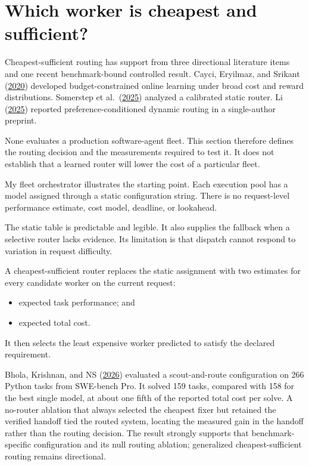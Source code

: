 \hypertarget{which-worker-is-cheapest-and-sufficient}{%
\section{Which worker is cheapest and sufficient?}\label{which-worker-is-cheapest-and-sufficient}}

Cheapest-sufficient routing has support from three directional literature items and one recent benchmark-bound controlled result. Cayci, Eryilmaz, and Srikant (\href{https://arxiv.org/abs/2003.00365}{2020}) developed budget-constrained online learning under broad cost and reward distributions. Somerstep et al.~(\href{https://arxiv.org/abs/2502.03261}{2025}) analyzed a calibrated static router. Li (\href{https://arxiv.org/abs/2502.02743}{2025}) reported preference-conditioned dynamic routing in a single-author preprint.

None evaluates a production software-agent fleet. This section therefore defines the routing decision and the measurements required to test it. It does not establish that a learned router will lower the cost of a particular fleet.

My fleet orchestrator illustrates the starting point. Each execution pool has a model assigned through a static configuration string. There is no request-level performance estimate, cost model, deadline, or lookahead.

The static table is predictable and legible. It also supplies the fallback when a selective router lacks evidence. Its limitation is that dispatch cannot respond to variation in request difficulty.


A cheapest-sufficient router replaces the static assignment with two estimates for every candidate worker on the current request:

\begin{itemize}
\tightlist
\item
  expected task performance; and
\item
  expected total cost.
\end{itemize}

It then selects the least expensive worker predicted to satisfy the declared requirement.

Bhola, Krishnan, and NS (\href{https://arxiv.org/abs/2608.04804}{2026}) evaluated a scout-and-route configuration on 266 Python tasks from SWE-bench Pro. It solved 159 tasks, compared with 158 for the best single model, at about one fifth of the reported total cost per solve. A no-router ablation that always selected the cheapest fixer but retained the verified handoff tied the routed system, locating the measured gain in the handoff rather than the routing decision. The result strongly supports that benchmark-specific configuration and its null routing ablation; generalized cheapest-sufficient routing remains directional.

